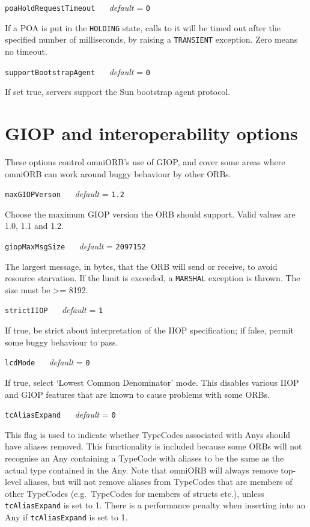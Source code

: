 \documentclass[11pt,twoside,a4paper]{book}
\makeatletter
\newcommand{\code}[1]{\texttt{#1}}
\newcommand{\confopt}[2]
  {\vspace{\baselineskip}\par\noindent\code{#1} ~~ \textit{default} =
   \code{#2}}
\renewcommand{\confopt}[2]
  {\vspace{\baselineskip}\par\noindent\code{#1} ~~ \textit{default} =
   \code{#2}\\[-1ex]\@afterheading}
\makeatother
\begin{document}
\confopt{poaHoldRequestTimeout}{0}

If a POA is put in the \code{HOLDING} state, calls to it will be timed
out after the specified number of milliseconds, by raising a
\code{TRANSIENT} exception. Zero means no timeout.


\confopt{supportBootstrapAgent}{0}

If set true, servers support the Sun bootstrap agent protocol.



\section{GIOP and interoperability options}

These options control omniORB's use of GIOP, and cover some areas
where omniORB can work around buggy behaviour by other ORBs.


\confopt{maxGIOPVerson}{1.2}

Choose the maximum GIOP version the ORB should support. Valid values
are 1.0, 1.1 and 1.2.


\confopt{giopMaxMsgSize}{2097152}

The largest message, in bytes, that the ORB will send or receive, to
avoid resource starvation. If the limit is exceeded, a \code{MARSHAL}
exception is thrown. The size must be >= 8192.

\confopt{strictIIOP}{1}

If true, be strict about interpretation of the IIOP specification; if
false, permit some buggy behaviour to pass.


\confopt{lcdMode}{0}

If true, select `Lowest Common Denominator' mode. This disables
various IIOP and GIOP features that are known to cause problems with
some ORBs.


\confopt{tcAliasExpand}{0}

This flag is used to indicate whether TypeCodes associated with Anys
should have aliases removed. This functionality is included because
some ORBs will not recognise an Any containing a TypeCode with aliases
to be the same as the actual type contained in the Any. Note that
omniORB will always remove top-level aliases, but will not remove
aliases from TypeCodes that are members of other TypeCodes (e.g.\
TypeCodes for members of structs etc.), unless \code{tcAliasExpand} is
set to 1. There is a performance penalty when inserting into an Any if
\code{tcAliasExpand} is set to 1.
\end{document}
